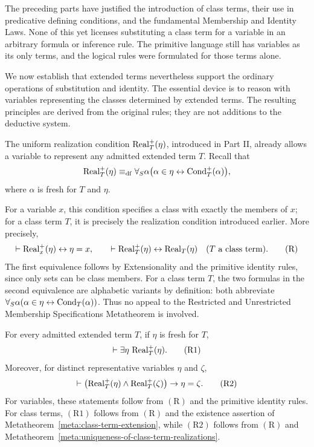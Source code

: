 The preceding parts have justified the introduction of class terms,
their use in predicative defining conditions, and the fundamental
Membership and Identity Laws. None of this yet licenses substituting
a class term for a variable in an arbitrary formula or inference rule.
The primitive language still has variables as its only terms, and the
logical rules were formulated for those terms alone.

We now establish that extended terms nevertheless support the ordinary
operations of substitution and identity. The essential device is to
reason with variables representing the classes determined by extended
terms. The resulting principles are derived from the original rules;
they are not additions to the deductive system.


The uniform realization condition \(\operatorname{Real}_T^+(\eta)\), introduced
in Part II, already allows a variable to represent any admitted
extended term \(T\). Recall that
\[
\operatorname{Real}_T^+(\eta)
\mathrel{\equiv_{\mathrm{df}}}
\forall_S\alpha\bigl(
\alpha\in\eta\leftrightarrow\operatorname{Cond}_T^+(\alpha)
\bigr),
\]
where \(\alpha\) is fresh for \(T\) and \(\eta\).

For a variable \(x\), this condition specifies a class with exactly
the members of \(x\); for a class term \(T\), it is precisely the
realization condition introduced earlier. More precisely,
\[
\vdash\operatorname{Real}_x^+(\eta)\leftrightarrow\eta=x,
\qquad
\vdash\operatorname{Real}_T^+(\eta)\leftrightarrow\operatorname{Real}_T(\eta)
\quad\text{(\(T\) a class term)}.
\tag{R}
\]
The first equivalence follows by Extensionality and the primitive
identity rules, since only sets can be class members. For a class
term \(T\), the two formulas in the second equivalence are
alphabetic variants by definition: both abbreviate
\(\forall_S\alpha(\alpha\in\eta\leftrightarrow\operatorname{Cond}_T(\alpha))\).
Thus no appeal to the Restricted and Unrestricted Membership
Specifications Metatheorem is involved.

For every admitted extended term \(T\), if \(\eta\) is fresh for \(T\),
\[
\vdash\exists\eta\,\operatorname{Real}^+_T(\eta).
\tag{R1}
\]
Moreover, for distinct representative variables \(\eta\) and
\(\zeta\),
\[
\vdash
\bigl(
\operatorname{Real}^+_T(\eta)\land
\operatorname{Real}^+_T(\zeta)
\bigr)\to\eta=\zeta.
\tag{R2}
\]
For variables, these statements follow from \((\mathrm{R})\)
and the primitive identity rules. For class terms, \((\mathrm{R1})\)
follows from \((\mathrm{R})\) and the existence assertion of
Metatheorem~\ref{meta:class-term-extension}, while \((\mathrm{R2})\)
follows from \((\mathrm{R})\) and
Metatheorem~\ref{meta:uniqueness-of-class-term-realizations}.


